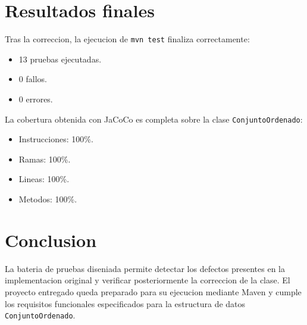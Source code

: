 \documentclass[11pt,a4paper]{article}
\begin{document}
\section{Resultados finales}
Tras la correccion, la ejecucion de \texttt{mvn test} finaliza correctamente:
\begin{itemize}
\item 13 pruebas ejecutadas.
\item 0 fallos.
\item 0 errores.
\end{itemize}

La cobertura obtenida con JaCoCo es completa sobre la clase \texttt{ConjuntoOrdenado}:
\begin{itemize}
\item Instrucciones: 100\%.
\item Ramas: 100\%.
\item Lineas: 100\%.
\item Metodos: 100\%.
\end{itemize}

\section{Conclusion}
La bateria de pruebas diseniada permite detectar los defectos presentes en la implementacion original y verificar posteriormente la correccion de la clase. El proyecto entregado queda preparado para su ejecucion mediante Maven y cumple los requisitos funcionales especificados para la estructura de datos \texttt{ConjuntoOrdenado}.
\end{document}
